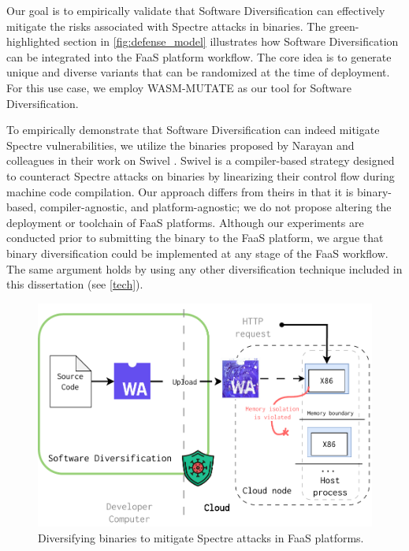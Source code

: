 


Our goal is to empirically validate that Software Diversification can effectively mitigate the risks associated with Spectre attacks in \Wasm binaries. 
The green-highlighted section in \autoref{fig:defense_model} illustrates how Software Diversification can be integrated into the FaaS platform workflow. 
The core idea is to generate unique and diverse \Wasm variants that can be randomized at the time of deployment. 
For this use case, we employ WASM-MUTATE as our tool for Software Diversification.

To empirically demonstrate that Software Diversification can indeed mitigate Spectre vulnerabilities, we utilize the \Wasm binaries proposed by Narayan and colleagues in their work on Swivel \cite{Swivel}. 
Swivel is a compiler-based strategy designed to counteract Spectre attacks on \Wasm binaries by linearizing their control flow during machine code compilation. 
Our approach differs from theirs in that it is binary-based, compiler-agnostic, and platform-agnostic; we do not propose altering the deployment or toolchain of FaaS platforms. 
Although our experiments are conducted prior to submitting the \Wasm binary to the FaaS platform, we argue that \Wasm binary diversification could be implemented at any stage of the FaaS workflow.
The same argument holds by using any other diversification technique included in this dissertation (see \autoref{tech}).


\begin{figure}[h]
    \centering
    \includegraphics[width=0.75\linewidth]{figures/edge_protected.pdf}
    \caption{Diversifying \Wasm binaries to mitigate Spectre attacks in FaaS platforms.}
    \label{fig:defense_model}
\end{figure}

